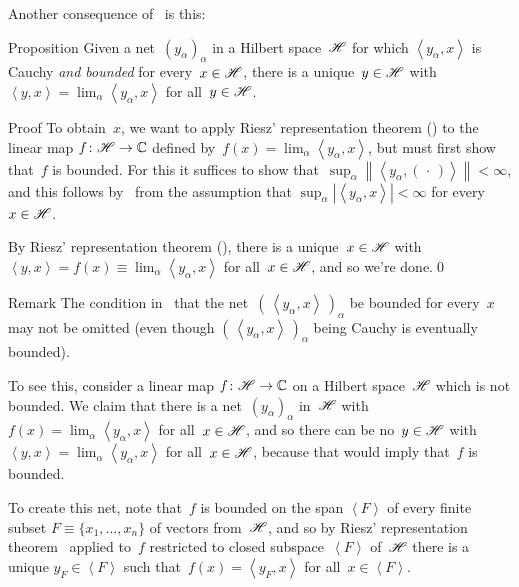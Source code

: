 \documentclass[a]{subfiles}
\begin{document}
\begin{parsec}%
\begin{point}%
	Another consequence of~
	is this:
\end{point}
\begin{point}{Proposition}%
Given a net~$(y_\alpha)_\alpha$
in a Hilbert space~$\mathscr{H}$
for which $\left<y_\alpha,x\right>$
is Cauchy \emph{and bounded}
for every~$x\in \mathscr{H}$,
there is a unique~$y\in\mathscr{H}$
with $\left<y,x\right>=\lim_\alpha \left<y_\alpha,x\right>$
for all~$y\in\mathscr{H}$.
\begin{point}{Proof}%
To obtain~$x$,
we want to apply  Riesz' representation theorem
()
to the linear map $f\colon \mathscr{H}\to\mathbb{C}$
defined by~$f(x)=\lim_\alpha\left<y_\alpha,x\right>$,
but must first show that~$f$ is bounded.
For this it suffices to show
that~$\sup_\alpha \left \|\left<y_\alpha,(\,\cdot\,)\right>\right\|<\infty$,
and this follows by~
from the assumption 
that $\sup_{\alpha} \left|\left<y_\alpha,x\right>\right| <\infty$
for every~$x\in \mathscr{H}$.

By Riesz' representation theorem (),
there is a unique~$x\in\mathscr{H}$ with 
$\left<y,x\right>=f(x)\equiv \lim_\alpha \left<y_\alpha,x\right>$
for all~$x\in \mathscr{H}$,
and so we're done.\qed
\end{point}
\begin{point}{Remark}%
The condition in~ 
that the net~$(\,\left<y_\alpha,x\right>\,)_\alpha$
be bounded for every~$x$ may not be omitted
(even though $(\,\left<y_\alpha,x\right>\,)_\alpha$
being Cauchy is eventually bounded).

To see this,
consider a linear map $f\colon \mathscr{H}\to\mathbb{C}$ on a Hilbert space~$\mathscr{H}$
which is not bounded.
We claim that there is a net~$(y_\alpha)_\alpha$ in~$\mathscr{H}$
with $f(x)=\lim_\alpha \left<y_\alpha,x\right>$ for all~$x\in\mathscr{H}$,
and so there can be no~$y\in \mathscr{H}$ 
with $\left<y,x\right> = \lim_\alpha \left<y_\alpha,x\right>$
for all~$x\in \mathscr{H}$, because 
that would imply that~$f$ is bounded.

To create this net,
note that~$f$ is bounded
on the span $\left<F\right>$ of every 
finite subset $F\equiv \{x_1,\dotsc,x_n\}$
of vectors from~$\mathscr{H}$,
and so by Riesz' representation theorem~
applied to~$f$ restricted to closed subspace~$\left<F\right>$
of~$\mathscr{H}$ there is a unique $y_F\in \left<F\right>$
such that~$f(x)=\left<y_F,x\right>$
for all~$x\in\left<F\right>$.


\end{point}
\end{point}
\end{parsec}
\end{document}

